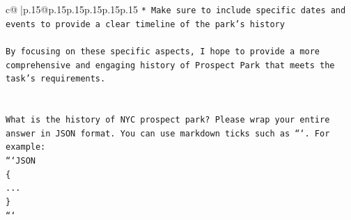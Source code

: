 \documentclass{article}
\begin{document}
{\begin{supertabular}{c@{$\;$}|p{.15\linewidth}@{}p{.15\linewidth}p{.15\linewidth}p{.15\linewidth}p{.15\linewidth}p{.15\linewidth}}
{{{\texttt{* Make sure to include specific dates and events to provide a clear timeline of the park's history} \\
\\ 
\texttt{By focusing on these specific aspects, I hope to provide a more comprehensive and engaging history of Prospect Park that meets the task's requirements.} \\
\\ 
\\ 
\texttt{What is the history of NYC prospect park? Please wrap your entire answer in JSON format. You can use markdown ticks such as ```. For example:} \\
\texttt{```JSON} \\
\texttt{\{} \\
\texttt{...} \\
\texttt{\}} \\
\texttt{```} \\
            }
        }
    }
     \\ \\


\end{supertabular}}
\end{document}
